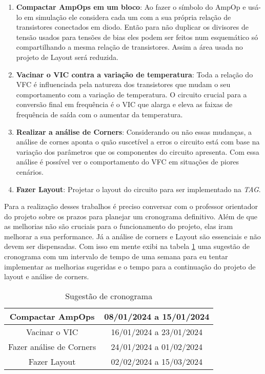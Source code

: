 \begin{enumerate}
\item \textbf{Compactar AmpOps em um bloco}: Ao fazer o símbolo do AmpOp e usá-lo em simulação ele considera cada um com a sua própria relação de transistores conectados em diodo. Então para não duplicar os divisores de tensão usados para tensões de bias eles podem ser feitos num esquemático só compartilhando a mesma relação de transistores. Assim a área usada no projeto de Layout será reduzida.
\item \textbf{Vacinar o VIC contra a variação de temperatura}: Toda a relação do VFC é influenciada pela natureza dos transistores que mudam o seu comportamento com a variação de temperatura. O circuito crucial para a conversão final em frequência é o VIC que alarga e eleva as faixas de frequência de saída com o aumentar da temperatura.
\item \textbf{Realizar a análise de Corners}: Considerando ou não essas mudanças, a análise de cornes aponta o quão suscetível a erros o circuito está com base na variação dos parâmetros que os componentes do circuito apresenta. Com essa análise é possível ver o comportamento do VFC em situações de piores cenários.
\item \textbf{Fazer Layout}: Projetar o layout do circuito para ser implementado na \textit{TAG}.   
\end{enumerate}

Para a realização desses trabalhos é preciso conversar com o professor orientador do projeto sobre os prazos para planejar um cronograma definitivo. Além de que as melhorias não são cruciais para o funcionamento do projeto, elas iram melhorar a sua performance. Já a análise de corners e Layout são essenciais e não devem ser dispensadas. Com isso em mente exibi na tabela \ref{tab:cronograma} uma sugestão de cronograma com um intervalo de tempo de uma semana para eu tentar implementar as melhorias sugeridas e o tempo para a continuação do projeto de layout e análise de corners.

\begin{table}[htb]
\centering
\begin{tabular}{|c|c|}
\hline 
Compactar AmpOps & 08/01/2024 a 15/01/2024 \\ 
\hline 
Vacinar o VIC & 16/01/2024 a 23/01/2024 \\ 
\hline 
Fazer análise de Corners & 24/01/2024 a 01/02/2024  \\ 
\hline 
Fazer Layout & 02/02/2024  a 15/03/2024\\ 
\hline 
\end{tabular} 
\caption{Sugestão de cronograma}
\label{tab:cronograma}
\end{table}






